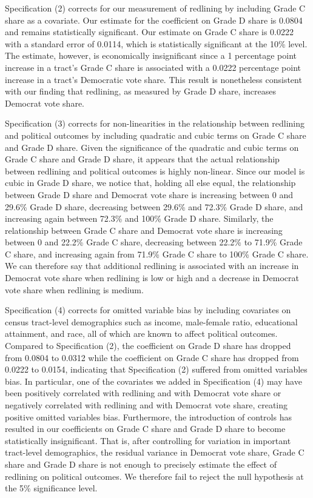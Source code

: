 \documentclass{eco_375_paper}
\begin{document}
Specification (2) corrects for our measurement of redlining by including Grade C share as a covariate. Our estimate for the coefficient on Grade D share is 0.0804 and remains statistically significant. Our estimate on Grade C share is 0.0222 with a standard error of 0.0114, which is statistically significant at the 10\% level. The estimate, however, is economically insignificant since a 1 percentage point increase in a tract’s Grade C share is associated with a 0.0222 percentage point increase in a tract’s Democratic vote share. This result is nonetheless consistent with our finding that redlining, as measured by Grade D share, increases Democrat vote share.

Specification (3) corrects for non-linearities in the relationship between redlining and political outcomes by including quadratic and cubic terms on Grade C share and Grade D share. Given the significance of the quadratic and cubic terms on Grade C share and Grade D share, it appears that the actual relationship between redlining and political outcomes is highly non-linear. Since our model is cubic in Grade D share, we notice that, holding all else equal, the relationship between Grade D share and Democrat vote share is increasing between 0 and 29.6\% Grade D share, decreasing between 29.6\% and 72.3\% Grade D share, and increasing again between 72.3\% and 100\% Grade D share. Similarly, the relationship between Grade C share and Democrat vote share is increasing between 0 and 22.2\% Grade C share, decreasing between 22.2\% to 71.9\% Grade C share, and increasing again from 71.9\% Grade C share to 100\% Grade C share. We can therefore say that additional redlining is associated with an increase in Democrat vote share when redlining is low or high and a decrease in Democrat vote share when redlining is medium.

Specification (4) corrects for omitted variable bias by including covariates on census tract-level demographics such as income, male-female ratio, educational attainment, and race, all of which are known to affect political outcomes. Compared to Specification (2), the coefficient on Grade D share has dropped from 0.0804 to 0.0312 while the coefficient on Grade C share has dropped from 0.0222 to 0.0154, indicating that Specification (2) suffered from omitted variables bias. In particular, one of the covariates we added in Specification (4) may have been positively correlated with redlining and with Democrat vote share or negatively correlated with redlining and with Democrat vote share, creating positive omitted variables bias. Furthermore, the introduction of controls has resulted in our coefficients on Grade C share and Grade D share to become statistically insignificant. That is, after controlling for variation in important tract-level demographics, the residual variance in Democrat vote share, Grade C share and Grade D share is not enough to precisely estimate the effect of redlining on political outcomes. We therefore fail to reject the null hypothesis at the 5\% significance level.
\end{document}

